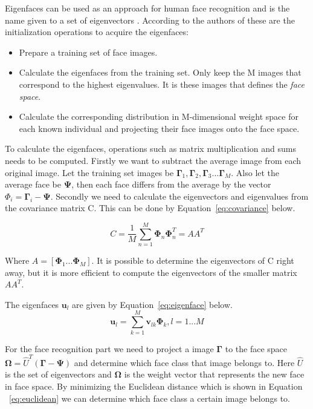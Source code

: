 Eigenfaces can be used as an approach for human face recognition and is the name given to a set of eigenvectors \cite{eigenface1}. According to the authors of \cite{eigenface2} these are the initialization operations to acquire the eigenfaces: 

\begin{itemize}
  \item Prepare a training set of face images.
  \item Calculate the eigenfaces from the training set. Only keep the M images that correspond to the highest eigenvalues. It is these images that defines the \emph{face space}.
  \item Calculate the corresponding distribution in M-dimensional weight space for each known individual and projecting their face images onto the face space. 
\end{itemize}

To calculate the eigenfaces, operations such as matrix multiplication and sums needs to be computed. Firstly we want to subtract the average image from each original image. Let the training set images be $\mathbf{\Gamma}_1,\mathbf{\Gamma}_2,\mathbf{\Gamma}_3...\mathbf{\Gamma}_M $. Also let the average face be $\mathbf{\Psi} $, then each face differs from the average by the vector $\Phi_i=\mathbf{\Gamma}_i - \mathbf{\Psi} $. Secondly we need to calculate the eigenvectors and eigenvalues from the covariance matrix C. This can be done by Equation~\ref{eq:covariance} below. 

\begin{equation}
C = \frac{1}{M}\sum_{n=1}^{M} \mathbf{\Phi}_n \mathbf{\Phi}_n^T = AA^T
\label{eq:covariance}
\end{equation}

Where $A=[\mathbf{\Phi}_1... \mathbf{\Phi}_M]. $ 
	It is possible to determine the eigenvectors of C right away, but it is more efficient to compute the eigenvectors of the smaller matrix $ AA^T $.

The eigenfaces $\mathbf{u}_l $ are given by Equation~\ref{eq:eigenface} below.
\begin{equation}
\mathbf{u}_l = \sum_{k=1}^{M} \mathbf{v}_{lk} \mathbf{\Phi}_k,          l=1...M
\label{eq:eigenface}
\end{equation}
	
	For the face recognition part we need to project a image $\mathbf{\Gamma} $ to the face space $\mathbf{\Omega} = \widehat{U}^T(\mathbf{\Gamma} - \mathbf{\Psi}) $ and determine which face class that image belongs to. Here $\widehat{U}$ is the set of eigenvectors and $\mathbf{\Omega}$ is the weight vector that represents the new face in face space. By minimizing the Euclidean distance which is shown in Equation ~\ref{eq:euclidean} we can determine which face class a certain image belongs to.
	
